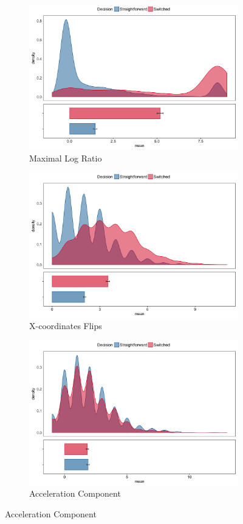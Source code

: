 \documentclass[11pt]{article}
\begin{document}
\begin{figure}
%
\begin{subfigure}[b]{0.4\textwidth}
\includegraphics[width=\textwidth]{MaxRatio_calibration.png}
\caption{Maximal Log Ratio}
\end{subfigure}
%
\begin{subfigure}[b]{0.4\textwidth}
\includegraphics[width=\textwidth]{Xflips_calibration.png}
\caption{X-coordinates Flips}
\end{subfigure}

\begin{subfigure}[b]{0.4\textwidth}
\includegraphics[width=\textwidth]{AC_calibration.png}
\caption{Acceleration Component}
\end{subfigure}


\end{figure}
\end{document}
